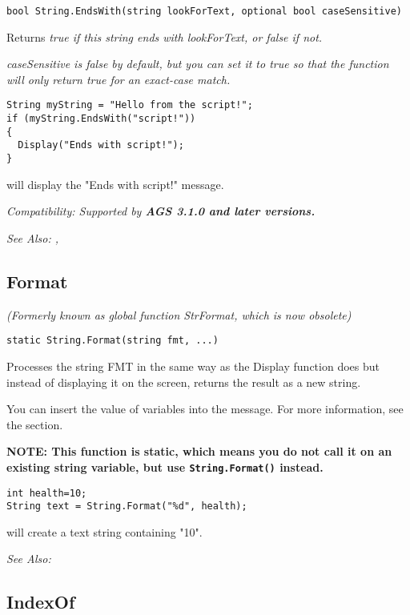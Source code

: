 \begin{verbatim}
bool String.EndsWith(string lookForText, optional bool caseSensitive)
\end{verbatim}
Returns \it{true} if this string ends with \it{lookForText}, or \it{false} if not.

\it{caseSensitive} is \it{false} by default, but you can set it to true so that the
function will only return \it{true} for an exact-case match.

\begin{verbatim}
String myString = "Hello from the script!";
if (myString.EndsWith("script!"))
{
  Display("Ends with script!");
}
\end{verbatim}
will display the "Ends with script!" message.

\it{Compatibility:} Supported by \bf{AGS 3.1.0} and later versions.

\it{See Also:} ,


\subsection{Format}\label{String.Format}%

\it{(Formerly known as global function StrFormat, which is now obsolete)}

\begin{verbatim}
static String.Format(string fmt, ...)
\end{verbatim}
Processes the string FMT in the same way as the Display function does but
instead of displaying it on the screen, returns the result as a new string.

You can insert the value of variables into the message. For more information,
see the  section.

\bf{NOTE:} This function is static, which means you do not call it on
an existing string variable, but use \verb$String.Format()$ instead.

\begin{verbatim}
int health=10;
String text = String.Format("%d", health);
\end{verbatim}
will create a text string containing "10".

\it{See Also:} 


\subsection{IndexOf}\label{String.IndexOf}%


